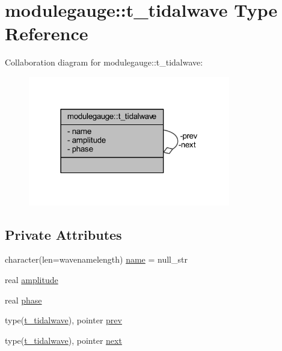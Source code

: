 \hypertarget{structmodulegauge_1_1t__tidalwave}{}\section{modulegauge\+:\+:t\+\_\+tidalwave Type Reference}
\label{structmodulegauge_1_1t__tidalwave}


Collaboration diagram for modulegauge\+:\+:t\+\_\+tidalwave\+:\nopagebreak
\begin{figure}[H]
\begin{center}
\leavevmode
\includegraphics[width=250pt]{structmodulegauge_1_1t__tidalwave__coll__graph}
\end{center}
\end{figure}
\subsection*{Private Attributes}
\begin{DoxyCompactItemize}
\item 
character(len=wavenamelength) \mbox{\hyperlink{structmodulegauge_1_1t__tidalwave_a264301064ce8c77b8dfbe66f0a61ac04}{name}} = null\+\_\+str
\item 
real \mbox{\hyperlink{structmodulegauge_1_1t__tidalwave_a971951bb7efb61e27e80bed973dd17c5}{amplitude}}
\item 
real \mbox{\hyperlink{structmodulegauge_1_1t__tidalwave_aa55ae2a43d20e147a1049762adfcaf94}{phase}}
\item 
type(\mbox{\hyperlink{structmodulegauge_1_1t__tidalwave}{t\+\_\+tidalwave}}), pointer \mbox{\hyperlink{structmodulegauge_1_1t__tidalwave_a291e7ea297c53005a6b3edf55cbe0a0c}{prev}}
\item 
type(\mbox{\hyperlink{structmodulegauge_1_1t__tidalwave}{t\+\_\+tidalwave}}), pointer \mbox{\hyperlink{structmodulegauge_1_1t__tidalwave_aaf3dc35f3d3e8f0a31a131664c9e145b}{next}}
\end{DoxyCompactItemize}


